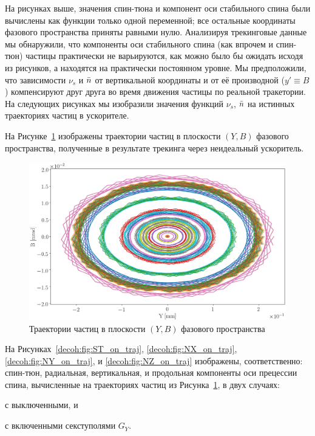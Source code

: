 На рисунках выше, значения спин-тюна и компонент оси стабильного спина были вычислены как функции только одной переменной; все остальные координаты фазового пространства приняты равными нулю. Анализируя трекинговые данные мы обнаружили, что компоненты оси стабильного спина (как впрочем и спин-тюн) частицы практически не варьируются, как можно было бы ожидать исходя из рисунков, а находятся на практически постоянном уровне. Мы предположили, что зависимости $\nu_s$ и $\bar n$ от вертикальной координаты и от её производной (${y'\equiv B}$) компенсируют друг друга во время движения частицы по реальной тракетории. На следующих рисунках мы изобразили значения функций $\nu_s$, $\bar n$ на истинных траекториях частиц в ускорителе.

На Рисунке~\ref{decoh:fig:yb_traj} изображены траектории частиц в плоскости $(Y,B)$ фазового пространства, полученные в результате трекинга через неидеальный ускоритель.
\begin{figure}[H]
	\centering
	\includegraphics[height=.35\paperheight]{images/decoh_sim/YB-PHASE_SPACE_IMPERFECT_UNOPT}
	\caption{Траектории частиц в плоскости $(Y,B)$ фазового пространства\label{decoh:fig:yb_traj}} 
\end{figure}

На Рисунках~\ref{decoh:fig:ST_on_traj}, \ref{decoh:fig:NX_on_traj}, \ref{decoh:fig:NY_on_traj}, и \ref{decoh:fig:NZ_on_traj} изображены, соответственно: спин-тюн, радиальная, вертикальная, и продольная компоненты оси прецессии спина, вычисленные на траекториях частиц из Рисунка~\ref{decoh:fig:yb_traj}, в двух случаях:
\begin{enumerate*}
	\item с выключенными, и 
	\item с включенными секступолями $G_Y$.
\end{enumerate*}  

